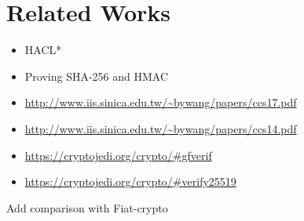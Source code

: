 \section{Related Works}

\begin{itemize}
  \item HACL*
  \item Proving SHA-256 and HMAC
  \item \url{http://www.iis.sinica.edu.tw/~bywang/papers/ccs17.pdf}
  \item \url{http://www.iis.sinica.edu.tw/~bywang/papers/ccs14.pdf}
  \item \url{https://cryptojedi.org/crypto/#gfverif}
  \item \url{https://cryptojedi.org/crypto/#verify25519}
\end{itemize}

Add comparison with Fiat-crypto 
